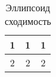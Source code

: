 \begin{table}[]
    \centering
    \begin{tabular}{c|c|c}
        1 &  1 &  1\\
         \hline
         2 &  2 & 2
    \end{tabular}
    \caption{Эллипсоид сходимость}
    \label{tab:my_label}
\end{table}